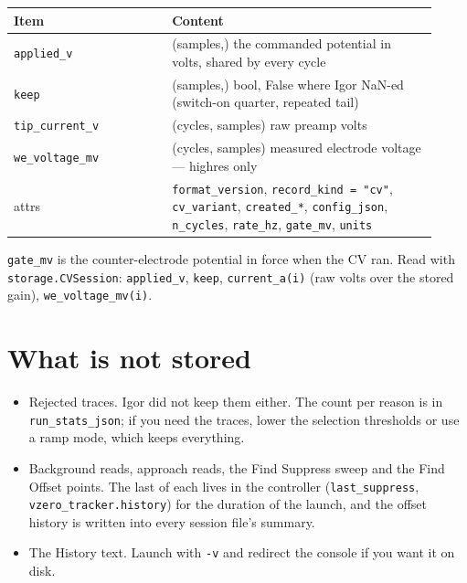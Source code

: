 \small\setlength{\LTleft}{0pt}\setlength{\LTright}{\fill}
\begin{longtable}{@{}>{\raggedright\arraybackslash}p{0.34\linewidth}>{\raggedright\arraybackslash}p{0.58\linewidth}@{}}
\toprule
\textbf{Item} & \textbf{Content} \\
\midrule\endhead
\texttt{applied\_\discretionary{}{}{}v} & (samples,) the commanded potential in volts, shared by every cycle \\
\texttt{keep} & (samples,) bool, False where Igor NaN-ed (switch-on quarter, repeated tail) \\
\texttt{tip\_\discretionary{}{}{}current\_\discretionary{}{}{}v} & (cycles, samples) raw preamp volts \\
\texttt{we\_\discretionary{}{}{}voltage\_\discretionary{}{}{}mv} & (cycles, samples) measured electrode voltage --- highres only \\
attrs & \texttt{format\_\discretionary{}{}{}version}, \texttt{record\_\discretionary{}{}{}kind = "cv"}, \texttt{cv\_\discretionary{}{}{}variant}, \texttt{created\_\discretionary{}{}{}*}, \texttt{config\_\discretionary{}{}{}json}, \texttt{n\_\discretionary{}{}{}cycles}, \texttt{rate\_\discretionary{}{}{}hz}, \texttt{gate\_\discretionary{}{}{}mv}, \texttt{units} \\
\bottomrule
\end{longtable}
\normalsize

\texttt{gate\_\discretionary{}{}{}mv} is the counter-electrode potential in force when the CV ran. Read with \texttt{storage.\discretionary{}{}{}CVSession}: \texttt{applied\_\discretionary{}{}{}v}, \texttt{keep}, \texttt{current\_\discretionary{}{}{}a(i)} (raw volts over the stored gain), \texttt{we\_\discretionary{}{}{}voltage\_\discretionary{}{}{}mv(i)}.

\section{What is not stored}

\begin{itemize}[leftmargin=*]
\item Rejected traces. Igor did not keep them either. The count per reason is in \texttt{run\_\discretionary{}{}{}stats\_\discretionary{}{}{}json}; if you need the traces, lower the selection thresholds or use a ramp mode, which keeps everything.
\item Background reads, approach reads, the Find Suppress sweep and the Find Offset points. The last of each lives in the controller (\texttt{last\_\discretionary{}{}{}suppress}, \texttt{vzero\_\discretionary{}{}{}tracker.\discretionary{}{}{}history}) for the duration of the launch, and the offset history is written into every session file's summary.
\item The History text. Launch with \texttt{-v} and redirect the console if you want it on disk.
\end{itemize}

